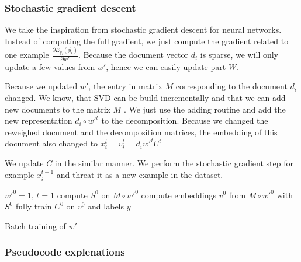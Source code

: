     \subsubsection{Stochastic gradient descent}
    
    We take the inspiration from stochastic gradient descent for neural networks.
    Instead of computing the full gradient, we just compute the gradient related to one example $\frac{\partial E_{y_i}(\hat{y_i})}{\partial w'}$.
    Because the document vector $d_i$ is sparse, we will only update a few values from $w'$, hence we can easily update part $W$.
    
    Because we updated $w'$, the entry in matrix $M$ corresponding to the document $d_i$ changed.
    We know, that SVD can be build incrementally and that we can add new documents to the matrix $M$ \cite{brand2006fast}.
    We just use the adding routine and add the new representation $d_i \circ w'^{t}$ to the decomposition.
    Because we changed the reweighed document and the decomposition matrices,
    the embedding of this document also changed to 
    $x_i^{t} = v_i^{t} = d_i w'^{t} U^{t}$
    
    We update $C$ in the similar manner.
    We perform the stochastic gradient step for example $x_i^{t+1}$ and threat it as a new example in the dataset.
    
    \begin{algorithm}[H]
        $w'^0 = 1$, $t=1$\;
        compute $S^0$ on $M \circ w'^{0}$\;
        compute embeddings $v^0$ from $M \circ w'^{0}$ with $S^0$\;
        fully train $C^0$ on $v^0$ and labels $y$\;
        
        \caption{Batch training of $w'$}
    \end{algorithm}
    
    \subsubsection{Pseudocode explenations}
    
